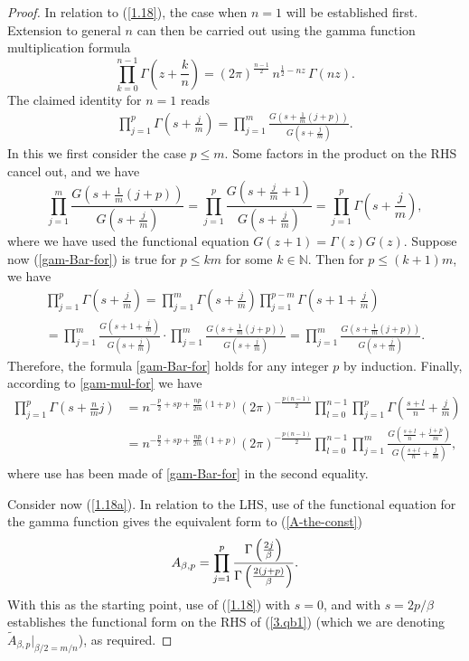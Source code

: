 \documentclass[11pt,a4paper]{article}
\numberwithin{equation}{section} %
\theoremstyle{plain}
\theoremstyle{definition}
\numberwithin{prop}{section}
\numberwithin{cor}{section}
\numberwithin{remark}{section}
\begin{document}
\begin{proof}
In relation to (\ref{1.18}),
 the case when $n=1$ will be established first. Extension to general $n$ can then be carried out using the gamma function multiplication formula
\begin{equation}\label{gam-mul-for}
    \prod_{k=0}^{n-1} \Gamma\!\left(z + \frac{k}{n}\right) = (2\pi)^{\frac{n-1}{2}} \, n^{\frac{1}{2} - nz} \, \Gamma(nz).
\end{equation}
The claimed identity for $n=1$ reads
\begin{align}\label{gam-Bar-for}
    \prod_{j=1}^p \Gamma\left(s+\frac{j}{m} \right)=\prod_{j=1}^{m} \frac{G\left(s+\frac{1}{m}(j+p)\right)}{G\left(s+\frac{j}{m} \right)}.
\end{align}
    In this we first consider the case $p \leqslant m$. Some factors in the product on the RHS cancel out, and we have
$$
\prod_{j=1}^{m} \frac{G\left(s+\frac{1}{m}(j+p)\right)}{G\left(s+\frac{j}{m} \right)}=\prod_{j=1}^p \frac{G\left(s+\frac{j}{m} +1\right)}{G\left(s+\frac{j}{m}\right)}=\prod_{j=1}^p \Gamma\left(s+\frac{j}{m}\right),
$$
where we have used the functional equation $G(z+1)=\Gamma(z) G(z)$. Suppose now 
(\ref{gam-Bar-for}) 
is true for $p \leqslant km$ for some $k \in \mathbb{N}$. Then for $p \leqslant (k+1)m$, we have
\begin{multline*}
\prod_{j=1}^p \Gamma\left(s+\frac{j}{m}\right)=\prod_{j=1}^{m} \Gamma\left(s+\frac{j}{m}\right) \prod_{j=1}^{p-m} \Gamma\left(s+1+\frac{j}{m}\right) \\
=\prod_{j=1}^{m} \frac{G\left(s+1+\frac{j}{m}\right)}{G\left(s+\frac{j}{m}\right)} \cdot \prod_{j=1}^{m} \frac{G\left(s+\frac{1}{m}(j+p)\right)}{G\left(s+\frac{j}{m}\right)} 
=\prod_{j=1}^{m} \frac{G\left(s+\frac{1}{m}(j+p)\right)}{G\left(s+\frac{j}{m}\right)} .
\end{multline*}
Therefore, the formula \eqref{gam-Bar-for} holds for any integer $p$ by induction. Finally, according to \eqref{gam-mul-for} we have
\begin{align*}
    \prod_{j=1}^{p}\Gamma\left(s+\frac{n}{m}j\right)&=n^{-\frac{p}{2}+sp+\frac{np}{2m}(1+p)}(2\pi)^{-\frac{p(n-1)}{2}}\prod_{l=0}^{n-1}\prod_{j=1}^{p}\Gamma\left(\frac{s+l}{n}+\frac{j}{m}\right)\\
    &=n^{-\frac{p}{2}+sp+\frac{np}{2m}(1+p)}(2\pi)^{-\frac{p(n-1)}{2}}\prod_{l=0}^{n-1}\prod_{j=1}^{m}\frac{G\left(\frac{s+l}{n}+\frac{j+p}{m}\right)}{G\left(\frac{s+l}{n}+\frac{j}{m}\right)},
\end{align*}
where use has been made of \eqref{gam-Bar-for} in the second equality.

Consider now (\ref{1.18a}). In relation to the LHS, use of the functional equation for the gamma function gives the equivalent form to (\ref{A-the-const})
$$
A_{\beta,p} = \prod_{j=1}^p 
{\Gamma\left({2j\over\beta}\right)\over\Gamma\left({2(j+p)\over\beta}\right)}.
$$
With this as the starting point, use of (\ref{1.18}) with $s=0$, and with $s=2p/\beta$
establishes the functional form on the RHS of (\ref{3.qb1}) (which we
are denoting $\tilde{A}_{\beta,p} |_{\beta/2=m/n}$), as required.
\end{proof}
\end{document}
